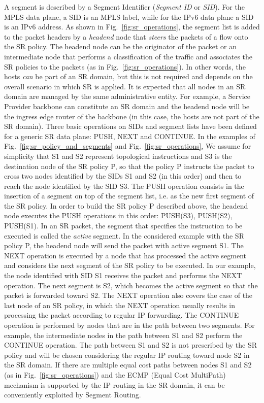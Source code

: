 A segment is described by a Segment Identifier (\textit{Segment ID} or \textit{SID}). For the MPLS data plane, a SID is an MPLS label, while for the IPv6 data plane a SID is an IPv6 address. As shown in Fig.~\ref{fig:sr_operations}, the segment list is added to the packet headers by a \textit{headend} node that \textit{steers} the packets of a flow onto the SR policy. The headend node can be the originator of the packet or an intermediate node that performs a classification of the traffic and associates the SR policies to the packets (as in Fig.~\ref{fig:sr_operations}). In other words, the hosts \textit{can} be part of an SR domain, but this is not required and depends on the overall scenario in which SR is applied. It is expected that all nodes in an SR domain are managed by the same administrative entity. For example, a Service Provider backbone can constitute an SR domain and the headend node will be the ingress edge router of the backbone (in this case, the hosts are not part of the SR domain). Three basic operations on SIDs and segment lists have been defined for a generic SR data plane: PUSH, NEXT and CONTINUE. In the examples of Fig.~\ref{fig:sr_policy_and_segments} and Fig.~\ref{fig:sr_operations}, We assume for simplicity that S1 and S2 represent topological instructions and S3 is the destination node of the SR policy P, so that the policy P instructs the packet to cross two nodes identified by the SIDs S1 and S2 (in this order) and then to reach the node identified by the SID S3. 
The PUSH operation consists in the insertion of a segment on top of the segment list, i.e. as the new first segment of the SR policy. In order to build the SR policy P described above, the headend node executes the PUSH operations in this order: PUSH(S3), PUSH(S2), PUSH(S1). In an SR packet, the segment that specifies the instruction to be executed is called the \textit{active} segment. In the considered example with the SR policy P, the headend node will send the packet with active segment S1. The NEXT operation is executed by a node that has processed the active segment and considers the next segment of the SR policy to be executed. In our example, the node identified with SID S1 receives the packet and performs the NEXT operation. The next segment is S2, which becomes the active segment so that the packet is forwarded toward S2. The NEXT operation also covers the case of the last node of an SR policy, in which the NEXT operation usually results in processing the packet according to regular IP forwarding. The CONTINUE operation is performed by nodes that are in the path between two segments. For example, the intermediate nodes in the path between S1 and S2 perform the CONTINUE operation. The path between S1 and S2 is not prescribed by the SR policy and will be chosen considering the regular IP routing toward node S2 in the SR domain. If there are multiple equal cost paths between nodes S1 and S2 (as in Fig.~\ref{fig:sr_operations}) and the ECMP (Equal Cost MultiPath) mechanism is supported by the IP routing in the SR domain, it can be conveniently exploited by Segment Routing. 

